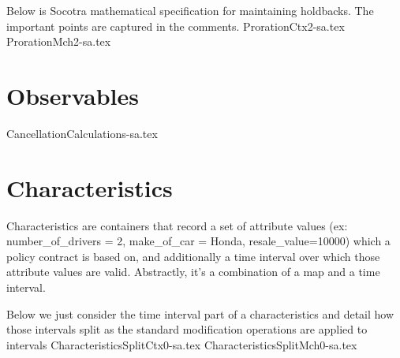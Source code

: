 Below is Socotra mathematical specification for maintaining holdbacks. The important points are captured in
the comments.
{ProrationCtx2-sa.tex}
{ProrationMch2-sa.tex}

\section{Observables}
\label{sec:03:6}

{CancellationCalculations-sa.tex}

\section{Characteristics}
\label{sec:03:5}

Characteristics are containers that record a set of attribute values
(ex: number\_of\_drivers = 2, make\_of\_car = Honda, resale\_value=10000)
which a policy contract is based on, and additionally a time interval over which
those attribute values are valid. Abstractly, it's a combination of a map and a time
interval. 

Below we just consider the time interval part of a characteristics and detail
how those intervals split as the standard modification operations are applied
to intervals
{CharacteristicsSplitCtx0-sa.tex}
{CharacteristicsSplitMch0-sa.tex}
